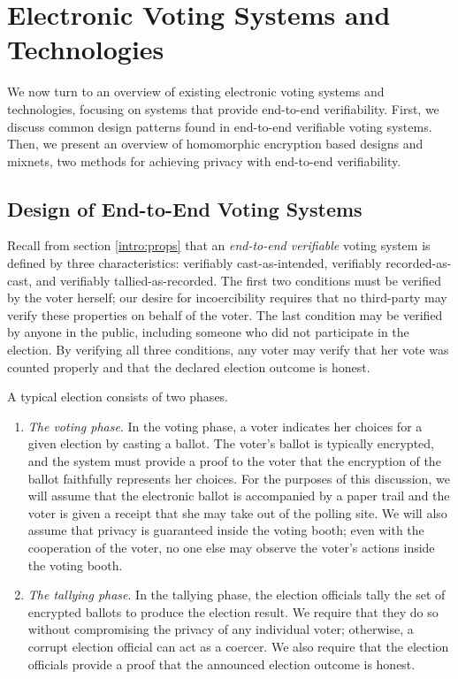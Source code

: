 \chapter{Electronic Voting Systems and Technologies} \label{evote}

We now turn to an overview of existing electronic voting systems and technologies, focusing on systems that provide end-to-end verifiability. First, we discuss common design patterns found in end-to-end verifiable voting systems. Then, we present an overview of homomorphic encryption based designs and mixnets, two methods for achieving privacy with end-to-end verifiability.

\section{Design of End-to-End Voting Systems} \label{evote:design}

Recall from section \ref{intro:props} that an \emph{end-to-end verifiable} voting system is defined by three characteristics: verifiably cast-as-intended, verifiably recorded-as-cast, and verifiably tallied-as-recorded. The first two conditions must be verified by the voter herself; our desire for incoercibility requires that no third-party may verify these properties on behalf of the voter. The last condition may be verified by anyone in the public, including someone who did not participate in the election. By verifying all three conditions, any voter may verify that her vote was counted properly and that the declared election outcome is honest.

A typical election consists of two phases.
\begin{enumerate}
\item \emph{The voting phase}. In the voting phase, a voter indicates her choices for a given election by casting a ballot. The voter's ballot is typically encrypted, and the system must provide a proof to the voter that the encryption of the ballot faithfully represents her choices. For the purposes of this discussion, we will assume that the electronic ballot is accompanied by a paper trail and the voter is given a receipt that she may take out of the polling site. We will also assume that privacy is guaranteed inside the voting booth; even with the cooperation of the voter, no one else may observe the voter's actions inside the voting booth.
\item \emph{The tallying phase}. In the tallying phase, the election officials tally the set of encrypted ballots to produce the election result. We require that they do so without compromising the privacy of any individual voter; otherwise, a corrupt election official can act as a coercer. We also require that the election officials provide a proof that the announced election outcome is honest.
\end{enumerate}

